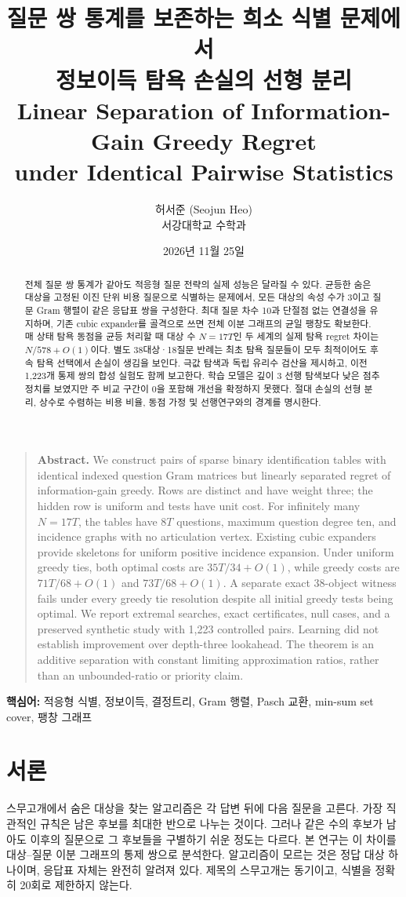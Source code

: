 \documentclass[11pt,a4paper]{article}
\title{\bfseries 질문 쌍 통계를 보존하는 희소 식별 문제에서\\정보이득 탐욕 손실의 선형 분리\\[.7em]
\large Linear Separation of Information-Gain Greedy Regret\\under Identical Pairwise Statistics}
\author{허서준 (Seojun Heo)\\\small 서강대학교 수학과}
\date{2026년 11월 25일}
\theoremstyle{definition}
\theoremstyle{remark}\newtheorem{remark}[theorem]{주석}
\begin{document}
\maketitle
\begin{abstract}
전체 질문 쌍 통계가 같아도 적응형 질문 전략의 실제 성능은 달라질 수 있다. 균등한 숨은 대상을 고정된 이진 단위 비용 질문으로 식별하는 문제에서, 모든 대상의 속성 수가 3이고 질문 Gram 행렬이 같은 응답표 쌍을 구성한다. 최대 질문 차수 10과 단절점 없는 연결성을 유지하며, 기존 cubic expander를 골격으로 쓰면 전체 이분 그래프의 균일 팽창도 확보한다. 매 상태 탐욕 동점을 균등 처리할 때 대상 수 $N=17T$인 두 세계의 실제 탐욕 regret 차이는 $N/578+O(1)$이다. 별도 38대상·18질문 반례는 최초 탐욕 질문들이 모두 최적이어도 후속 탐욕 선택에서 손실이 생김을 보인다. 극값 탐색과 독립 유리수 검산을 제시하고, 이전 1,223개 통제 쌍의 합성 실험도 함께 보고한다. 학습 모델은 깊이 3 선행 탐색보다 낮은 점추정치를 보였지만 주 비교 구간이 0을 포함해 개선을 확정하지 못했다. 절대 손실의 선형 분리, 상수로 수렴하는 비용 비율, 동점 가정 및 선행연구와의 경계를 명시한다.
\end{abstract}
\begin{quote}\small
\textbf{Abstract.} We construct pairs of sparse binary identification tables with identical indexed question Gram matrices but linearly separated regret of information-gain greedy. Rows are distinct and have weight three; the hidden row is uniform and tests have unit cost. For infinitely many $N=17T$, the tables have $8T$ questions, maximum question degree ten, and incidence graphs with no articulation vertex. Existing cubic expanders provide skeletons for uniform positive incidence expansion. Under uniform greedy ties, both optimal costs are $35T/34+O(1)$, while greedy costs are $71T/68+O(1)$ and $73T/68+O(1)$. A separate exact 38-object witness fails under every greedy tie resolution despite all initial greedy tests being optimal. We report extremal searches, exact certificates, null cases, and a preserved synthetic study with 1,223 controlled pairs. Learning did not establish improvement over depth-three lookahead. The theorem is an additive separation with constant limiting approximation ratios, rather than an unbounded-ratio or priority claim.
\end{quote}
\noindent\textbf{핵심어:} 적응형 식별, 정보이득, 결정트리, Gram 행렬, Pasch 교환, min-sum set cover, 팽창 그래프

\section{서론}
스무고개에서 숨은 대상을 찾는 알고리즘은 각 답변 뒤에 다음 질문을 고른다. 가장 직관적인 규칙은 남은 후보를 최대한 반으로 나누는 것이다. 그러나 같은 수의 후보가 남아도 이후의 질문으로 그 후보들을 구별하기 쉬운 정도는 다르다. 본 연구는 이 차이를 대상--질문 이분 그래프의 통제 쌍으로 분석한다. 알고리즘이 모르는 것은 정답 대상 하나이며, 응답표 자체는 완전히 알려져 있다. 제목의 스무고개는 동기이고, 식별을 정확히 20회로 제한하지 않는다.
\end{document}
